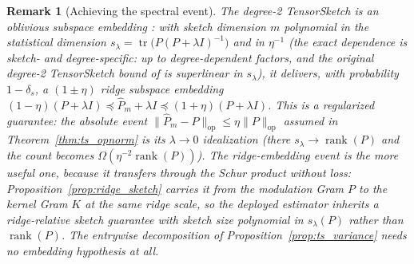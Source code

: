 \documentclass{article}
\newtheorem{remark}[theorem]{Remark}
\begin{document}
\begin{remark}[Achieving the spectral event]\label{rmk:ose}
The degree-2 TensorSketch is an oblivious subspace embedding \citep{pham2013fast,avron2014subspace}: with sketch dimension $m$ polynomial in the statistical dimension $s_\lambda=\operatorname{tr}\!\bigl(P(P+\lambda I)^{-1}\bigr)$ and in $\eta^{-1}$ (the exact dependence is sketch- and degree-specific: up to degree-dependent factors, and the original degree-2 TensorSketch bound of \citet{avron2014subspace} is superlinear in $s_\lambda$), it delivers, with probability $1-\delta_s$, a $(1\pm\eta)$ \emph{ridge} subspace embedding $(1-\eta)(P+\lambda I)\preceq\widehat P_m+\lambda I\preceq(1+\eta)(P+\lambda I)$. This is a \emph{regularized} guarantee: the absolute event $\|\widehat P_m-P\|_{\mathrm{op}}\le\eta\|P\|_{\mathrm{op}}$ assumed in Theorem~\ref{thm:ts_opnorm} is its $\lambda\to0$ idealization (there $s_\lambda\to\operatorname{rank}(P)$ and the count becomes $\Omega(\eta^{-2}\operatorname{rank}(P))$). The ridge-embedding event is the more useful one, because it transfers through the Schur product without loss: Proposition~\ref{prop:ridge_sketch} carries it from the modulation Gram $P$ to the kernel Gram $K$ at the \emph{same} ridge scale, so the deployed estimator inherits a ridge-relative sketch guarantee with sketch size polynomial in $s_\lambda(P)$ rather than $\operatorname{rank}(P)$. The entrywise decomposition of Proposition~\ref{prop:ts_variance} needs no embedding hypothesis at all.
\end{remark}
\end{document}
